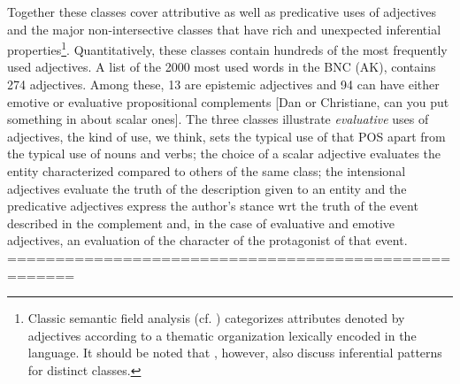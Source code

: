 \documentclass[10pt]{article}
\begin{document}
Together these classes cover attributive as well as predicative uses of adjectives and the major non-intersective classes that have rich and unexpected inferential properties\footnote{Classic semantic field analysis (cf. \cite{dixon:91,lyons:77,raskin1995lexical}) categorizes attributes denoted by adjectives according to a thematic organization lexically encoded in the language. It should be noted that \cite{raskin1995lexical}, however, also discuss inferential patterns for distinct classes.}. Quantitatively, these classes contain hundreds of the most frequently used adjectives. A list of the 2000 most used words in the BNC (AK), contains 274 adjectives. Among these, 13 are epistemic adjectives and 94 can have either emotive or evaluative propositional complements [Dan or Christiane, can you put something in about scalar ones]. The three classes illustrate \emph{evaluative} uses of adjectives, the kind of use, we think, sets the typical use of that POS apart from the typical use of nouns and verbs; the choice of a scalar adjective evaluates the entity characterized compared to others of the same class; the intensional adjectives evaluate the truth of the description given to an entity and the predicative adjectives express the author's stance wrt the truth of the event described in the complement and, in the case of evaluative and emotive adjectives, an evaluation of the character of the protagonist of that event. 
 =====================================================
\end{document}
